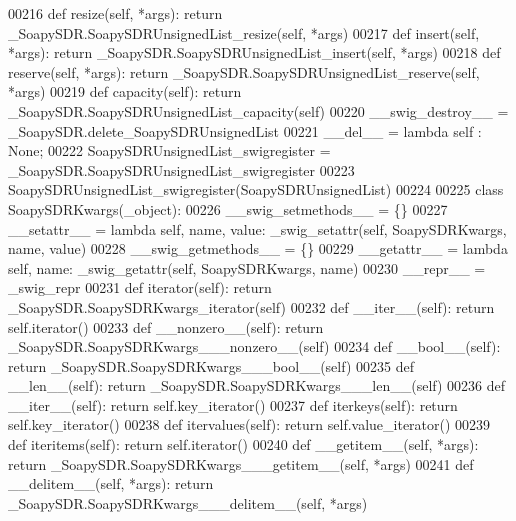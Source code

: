 \begin{DoxyCode}
{{{00216     \textcolor{keyword}{def }resize(self, *args): \textcolor{keywordflow}{return} \_SoapySDR.SoapySDRUnsignedList\_resize(self, *args)
00217     \textcolor{keyword}{def }insert(self, *args): \textcolor{keywordflow}{return} \_SoapySDR.SoapySDRUnsignedList\_insert(self, *args)
00218     \textcolor{keyword}{def }reserve(self, *args): \textcolor{keywordflow}{return} \_SoapySDR.SoapySDRUnsignedList\_reserve(self, *args)
00219     \textcolor{keyword}{def }capacity(self): \textcolor{keywordflow}{return} \_SoapySDR.SoapySDRUnsignedList\_capacity(self)
00220     \_\_swig\_destroy\_\_ = \_SoapySDR.delete\_SoapySDRUnsignedList
00221     \_\_del\_\_ = \textcolor{keyword}{lambda} self : \textcolor{keywordtype}{None};
00222 SoapySDRUnsignedList\_swigregister = \_SoapySDR.SoapySDRUnsignedList\_swigregister
00223 SoapySDRUnsignedList_swigregister(SoapySDRUnsignedList)
00224 
00225 \textcolor{keyword}{class }SoapySDRKwargs(_object):
00226     \_\_swig\_setmethods\_\_ = \{\}
00227     \_\_setattr\_\_ = \textcolor{keyword}{lambda} self, name, value: _swig_setattr(self, SoapySDRKwargs, name, value)
00228     \_\_swig\_getmethods\_\_ = \{\}
00229     \_\_getattr\_\_ = \textcolor{keyword}{lambda} self, name: _swig_getattr(self, SoapySDRKwargs, name)
00230     \_\_repr\_\_ = \_swig\_repr
00231     \textcolor{keyword}{def }iterator(self): \textcolor{keywordflow}{return} \_SoapySDR.SoapySDRKwargs\_iterator(self)
00232     \textcolor{keyword}{def }__iter__(self): \textcolor{keywordflow}{return} self.iterator()
00233     \textcolor{keyword}{def }__nonzero__(self): \textcolor{keywordflow}{return} \_SoapySDR.SoapySDRKwargs\_\_\_nonzero\_\_(self)
00234     \textcolor{keyword}{def }__bool__(self): \textcolor{keywordflow}{return} \_SoapySDR.SoapySDRKwargs\_\_\_bool\_\_(self)
00235     \textcolor{keyword}{def }__len__(self): \textcolor{keywordflow}{return} \_SoapySDR.SoapySDRKwargs\_\_\_len\_\_(self)
00236     \textcolor{keyword}{def }__iter__(self): \textcolor{keywordflow}{return} self.key_iterator()
00237     \textcolor{keyword}{def }iterkeys(self): \textcolor{keywordflow}{return} self.key_iterator()
00238     \textcolor{keyword}{def }itervalues(self): \textcolor{keywordflow}{return} self.value_iterator()
00239     \textcolor{keyword}{def }iteritems(self): \textcolor{keywordflow}{return} self.iterator()
00240     \textcolor{keyword}{def }__getitem__(self, *args): \textcolor{keywordflow}{return} \_SoapySDR.SoapySDRKwargs\_\_\_getitem\_\_(self, *args)
00241     \textcolor{keyword}{def }__delitem__(self, *args): \textcolor{keywordflow}{return} \_SoapySDR.SoapySDRKwargs\_\_\_delitem\_\_(self, *args)
}}}
\end{DoxyCode}
